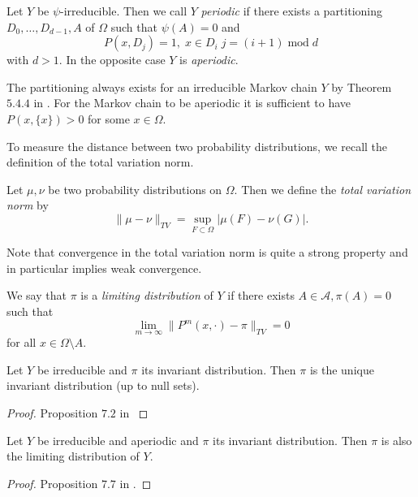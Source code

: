 \begin{definition} Let $Y$ be $\psi$-irreducible. Then we call $Y$ \textit{periodic} if there exists a partitioning $D_0,\dots,D_{d-1},A$ of $\Omega$ such that $\psi(A)=0$ and 
$$P(x,D_{j}) = 1, \; x\in D_i\; j=(i+1)\; \mathrm{mod} \;d$$
with $d>1$. In the opposite case $Y$ is \textit{aperiodic}.
\end{definition}
The partitioning always exists for an irreducible Markov chain $Y$ by Theorem $5.4.4$ in \cite{MeynTweedie1993}. For the Markov chain to be aperiodic it is sufficient to have $P(x,\{x\})>0$ for some $x \in \Omega$.



To measure the distance between two probability distributions, we recall the definition of the total variation norm.
\begin{definition} 
Let $\mu,\nu$ be two probability distributions on $\Omega$. Then we define the \textit{total variation norm} by 
$$\| \mu -\nu\|_{TV} = \sup_{F \subset \Omega} |\mu(F) - \nu(G)|.$$
\end{definition}
Note that convergence in the total variation norm is quite a strong property and in particular implies weak convergence.


\begin{definition} We say that $\pi$ is a \textit{limiting distribution} of $Y$ if there exists $A\in\mathcal A, \pi(A)=0$ such that
$$\lim_{m\to \infty} \|P^m(x,\cdot) - \pi\|_{TV} = 0$$
for all $x \in \Omega \setminus A$.
\end{definition}



\begin{proposition}\label{prop:MC1} Let $Y$ be irreducible and $\pi$ its invariant distribution. Then $\pi$ is the unique invariant distribution (up to null sets).
\end{proposition}
\begin{proof}
Proposition $7.2$ in \cite{MollerWaagepetersen2003}
\end{proof}

\begin{proposition}\label{prop:MC2} Let $Y$ be irreducible  and aperiodic and $\pi$ its invariant distribution. Then $\pi$ is also the limiting distribution of $Y$. 
\end{proposition}
\begin{proof}
Proposition $7.7$ in \cite{MollerWaagepetersen2003}.
\end{proof}



